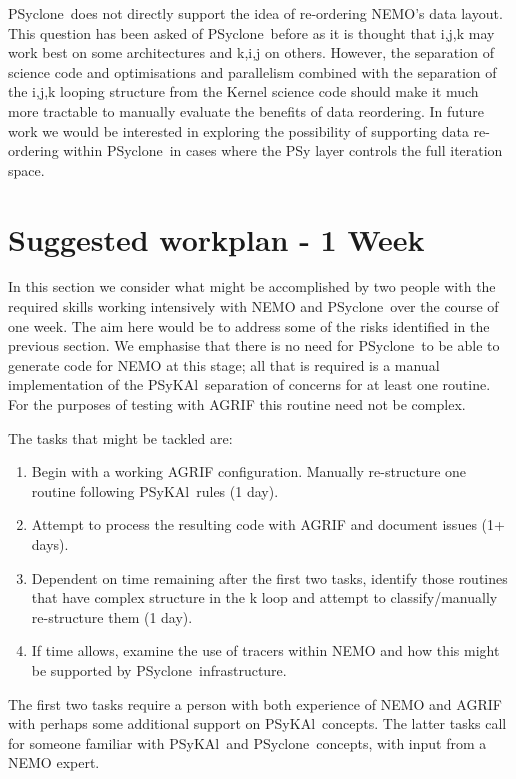 \documentclass{article}
\newcommand{\psykal}{{PS}y{KA}l}
\newcommand{\psyclone}{{PS}yclone}
\begin{document}
\psyclone\ does not directly support the idea of re-ordering NEMO's data
layout. This question has been asked of \psyclone\ before as it is
thought that i,j,k may work best on some architectures and k,i,j on
others. However, the separation of science code and optimisations and
parallelism combined with the separation of the i,j,k looping
structure from the Kernel science code should make it much more
tractable to manually evaluate the benefits of data reordering. In
future work we would be interested in exploring the possibility of
supporting data re-ordering within \psyclone\ in cases where the PSy
layer controls the full iteration space.

\section{Suggested workplan - 1 Week}

In this section we consider what might be accomplished by two people
with the required skills working intensively with NEMO and \psyclone\
over the course of one week. The aim here would be to address some of
the risks identified in the previous section. We emphasise that there
is no need for \psyclone\ to be able to generate code for NEMO at this
stage; all that is required is a manual implementation of the
\psykal\ separation of concerns for at least one routine. For the
purposes of testing with AGRIF this routine need not be complex.

The tasks that might be tackled are:
\begin{enumerate}

\item Begin with a working AGRIF configuration. Manually 
 re-structure one routine following \psykal\ rules (1 day).

\item Attempt to process the resulting code with AGRIF and 
 document issues (1+ days).

\item Dependent on time remaining after the first two tasks, identify
  those routines that have complex structure in the k loop and attempt
  to classify/manually re-structure them (1 day).

\item If time allows, examine the use of tracers within NEMO and how
  this might be supported by \psyclone\ infrastructure.

\end{enumerate}
The first two tasks require a person with both experience of NEMO and
AGRIF with perhaps some additional support on \psykal\ concepts.  The
latter tasks call for someone familiar with \psykal\ and \psyclone\
concepts, with input from a NEMO expert.
\end{document}
